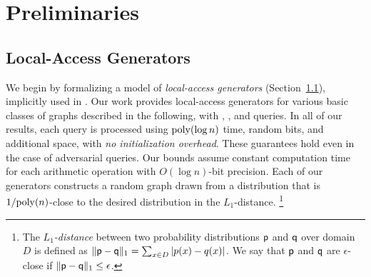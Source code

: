 \section{Preliminaries}
\label{sec:model}
\subsection{Local-Access Generators}
\label{sec:oracle_model}

We begin by formalizing a model of {\em local-access generators} (Section~\ref{sec:oracle_model}), implicitly used in \cite{reut}.
Our work provides local-access generators for various basic classes of graphs described in the following, with 
, , and  queries.
In all of our results, each query is processed using $\mathrm{poly}(\log n)$ time, random bits, and additional space, with \emph{no initialization overhead}.
These guarantees hold even in the case of adversarial queries.
Our bounds assume constant computation time for each arithmetic operation with $O(\log n)$-bit precision.
Each of our generators constructs a random graph drawn from a distribution that is $1/\mathrm{poly}(n)$-close to the desired distribution in the $L_1$-distance.
\footnote{The \emph{$L_1$-distance} between two probability distributions $\mathsf{p}$ and $\mathsf{q}$ over domain $D$
is defined as $\|\mathsf{p-q}\|_1 = \sum_{x \in D } |p(x)-q(x)|$.
We say that $\mathsf{p}$ and $\mathsf{q}$ are $\epsilon$-close if $\|\mathsf{p-q}\|_1 \leq \epsilon$.}

